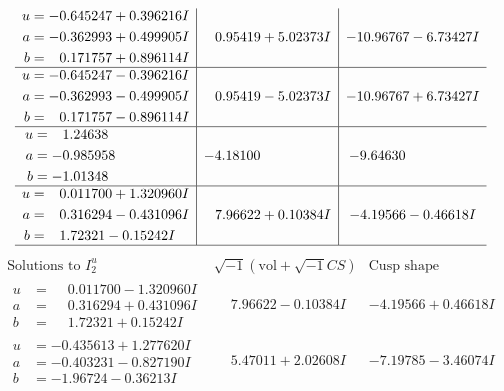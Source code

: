 \documentclass[1p]{elsarticle_modified}
\theoremstyle{definition}
\newcommand{\I}{\sqrt{-1}}
\begin{document}
$$\begin{array}{c|c|c}
\begin{aligned}
u &= -0.645247 + 0.396216 I \\
a &= -0.362993 + 0.499905 I \\
b &= \phantom{-}0.171757 + 0.896114 I\end{aligned}
 & \phantom{-}0.95419 + 5.02373 I & -10.96767 - 6.73427 I \\ \hline\begin{aligned}
u &= -0.645247 - 0.396216 I \\
a &= -0.362993 - 0.499905 I \\
b &= \phantom{-}0.171757 - 0.896114 I\end{aligned}
 & \phantom{-}0.95419 - 5.02373 I & -10.96767 + 6.73427 I \\ \hline\begin{aligned}
u &= \phantom{-}1.24638\phantom{ +0.000000I} \\
a &= -0.985958\phantom{ +0.000000I} \\
b &= -1.01348\phantom{ +0.000000I}\end{aligned}
 & -4.18100\phantom{ +0.000000I} & -9.64630\phantom{ +0.000000I} \\ \hline\begin{aligned}
u &= \phantom{-}0.011700 + 1.320960 I \\
a &= \phantom{-}0.316294 - 0.431096 I \\
b &= \phantom{-}1.72321 - 0.15242 I\end{aligned}
 & \phantom{-}7.96622 + 0.10384 I & -4.19566 - 0.46618 I\\
 \hline 
 \end{array}$$\newpage$$\begin{array}{c|c|c}  
\text{Solutions to }I^u_{2}& \I (\text{vol} + \sqrt{-1}CS) & \text{Cusp shape}\\
 \hline 
\begin{aligned}
u &= \phantom{-}0.011700 - 1.320960 I \\
a &= \phantom{-}0.316294 + 0.431096 I \\
b &= \phantom{-}1.72321 + 0.15242 I\end{aligned}
 & \phantom{-}7.96622 - 0.10384 I & -4.19566 + 0.46618 I \\ \hline\begin{aligned}
u &= -0.435613 + 1.277620 I \\
a &= -0.403231 - 0.827190 I \\
b &= -1.96724 - 0.36213 I\end{aligned}
 & \phantom{-}5.47011 + 2.02608 I & -7.19785 - 3.46074 I \\ \hline\begin{aligned}

\end{aligned}
\end{array}$$
\end{document}
